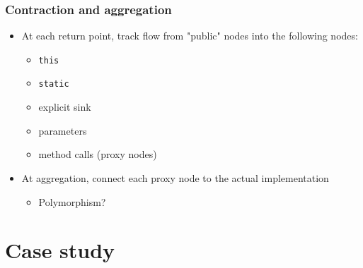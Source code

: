 \documentclass{beamer}
\newcommand{\code}[1]{\colorbox{code}{\texttt{\footnotesize #1}}}
\begin{document}
\begin{frame}
  \frametitle{Contraction and aggregation}
  \begin{itemize}
    \item At each return point, track flow from "public" nodes into the following nodes:
      \begin{itemize}
        \item \code{this}
        \item \code{static}
        \item explicit sink
        \item parameters
        \item method calls (proxy nodes)
      \end{itemize}
    \item At aggregation, connect each proxy node to the actual implementation
      \begin{itemize}
        \item Polymorphism?
      \end{itemize}
  \end{itemize}
\end{frame}

\section{Case study}
\end{document}
